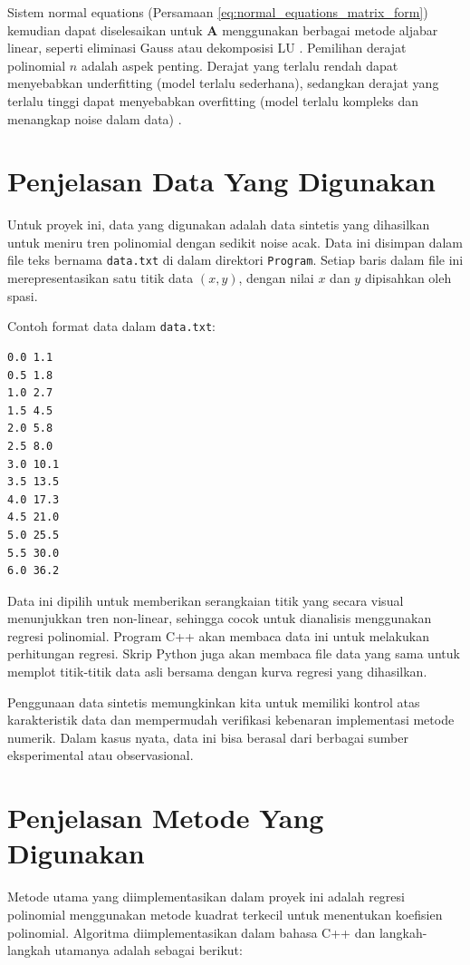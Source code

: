 \documentclass[conference]{IEEEtran}
\begin{document}
Sistem normal equations (Persamaan \ref{eq:normal_equations_matrix_form}) kemudian dapat diselesaikan untuk $\mathbf{A}$ menggunakan berbagai metode aljabar linear, seperti eliminasi Gauss atau dekomposisi LU \cite{b1}. Pemilihan derajat polinomial $n$ adalah aspek penting. Derajat yang terlalu rendah dapat menyebabkan underfitting (model terlalu sederhana), sedangkan derajat yang terlalu tinggi dapat menyebabkan overfitting (model terlalu kompleks dan menangkap noise dalam data) \cite{b2}.

\section{Penjelasan Data Yang Digunakan}
Untuk proyek ini, data yang digunakan adalah data sintetis yang dihasilkan untuk meniru tren polinomial dengan sedikit noise acak. Data ini disimpan dalam file teks bernama \texttt{data.txt} di dalam direktori \texttt{Program}. Setiap baris dalam file ini merepresentasikan satu titik data $(x, y)$, dengan nilai $x$ dan $y$ dipisahkan oleh spasi.

Contoh format data dalam \texttt{data.txt}:
\begin{verbatim}
0.0 1.1
0.5 1.8
1.0 2.7
1.5 4.5
2.0 5.8
2.5 8.0
3.0 10.1
3.5 13.5
4.0 17.3
4.5 21.0
5.0 25.5
5.5 30.0
6.0 36.2
\end{verbatim}
Data ini dipilih untuk memberikan serangkaian titik yang secara visual menunjukkan tren non-linear, sehingga cocok untuk dianalisis menggunakan regresi polinomial. Program C++ akan membaca data ini untuk melakukan perhitungan regresi. Skrip Python juga akan membaca file data yang sama untuk memplot titik-titik data asli bersama dengan kurva regresi yang dihasilkan.

Penggunaan data sintetis memungkinkan kita untuk memiliki kontrol atas karakteristik data dan mempermudah verifikasi kebenaran implementasi metode numerik. Dalam kasus nyata, data ini bisa berasal dari berbagai sumber eksperimental atau observasional.

\section{Penjelasan Metode Yang Digunakan}
Metode utama yang diimplementasikan dalam proyek ini adalah regresi polinomial menggunakan metode kuadrat terkecil untuk menentukan koefisien polinomial. Algoritma diimplementasikan dalam bahasa C++ dan langkah-langkah utamanya adalah sebagai berikut:
\end{document}
